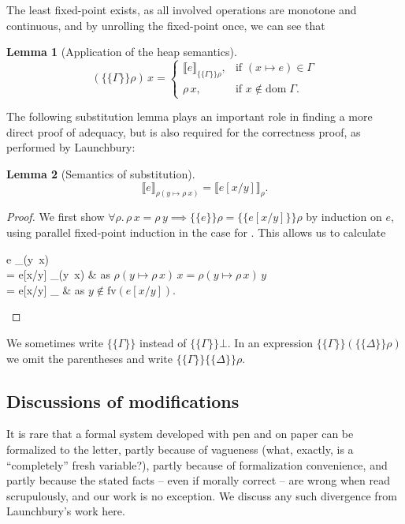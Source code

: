 \documentclass{jfp1}
\newtheorem{lemma}{Lemma}
\theoremstyle{nonumberbreak}
\newtheorem{proof}{Proof}
\newcommand{\keyword}[1]{\text{\textsf{#1}}}
\newcommand{\fv}[1]{\text{fv}(#1)}
\newcommand{\dom}[1]{\text{dom}\;#1}
\newcommand{\dsem}[2]{\llbracket #1 \rrbracket_{#2}}
\newcommand{\esem}[1]{\{\!\!\!\{#1\}\!\!\!\}}
\begin{document}
The least fixed-point exists, as all involved operations are monotone and continuous, and by unrolling the fixed-point once, we can see that

\begin{lemma}[Application of the heap semantics]
\[
\label{lem_esem_this}
\label{lem_esem_other}
(\esem{\Gamma}\rho)\,x =
\begin{cases}
\dsem{e}{\esem{\Gamma}\rho}, & \text{if } (x\mapsto e)\in \Gamma \\
\rho\, x, & \text{if } x \notin \dom\Gamma.
\end{cases}
\]
\end{lemma}

The following substitution lemma plays an important role in finding a more direct proof of adequacy, but is also required for the correctness proof, as performed by Launchbury:

\begin{lemma}[Semantics of substitution]
\[
\label{lem_subst}
\dsem{e}{\rho (y \mapsto \rho~x)} = \dsem{ e[x/y]}{\rho}.
\]
\end{lemma}

\begin{proof}
We first show $\forall\rho.\, \rho\,x = \rho\,y \implies \esem{e}\rho = \esem{e[x/y]}\rho$ by induction on $e$, using parallel fixed-point induction in the case for \keyword{let}. This allows us to calculate
\begin{conteq}
\dsem{e}{\rho (y \mapsto \rho\,x)} \\
= \dsem{e[x/y]}{\rho (y \mapsto \rho\,x)} & as $\rho (y \mapsto \rho\,x)\,x=\rho (y \mapsto \rho\,x)\,y$ \\
=  \dsem{e[x/y]}{\rho} & as $y\notin \fv{e[x/y]}$.
\end{conteq}
\end{proof}


We sometimes write $\esem{\Gamma}$ instead of $\esem{\Gamma}{\bot}$. In an expression $\esem{\Gamma}(\esem{\Delta}\rho)$ we omit the parentheses and write $\esem{\Gamma}\esem{\Delta}\rho$.


\subsection{Discussions of modifications}
\label{sec_modifications1}

It is rare that a formal system developed with pen and on paper can be formalized to the letter, partly because of vagueness (what, exactly, is a ``completely'' fresh variable?), partly because of formalization convenience, and partly because the stated facts -- even if morally correct -- are wrong when read scrupulously, and our work is no exception. We discuss any such divergence from Launchbury's work here.
\end{document}

